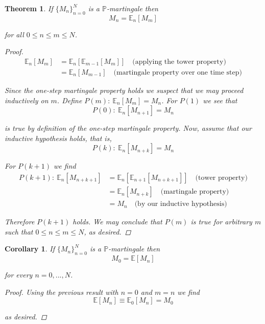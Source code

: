 \documentclass[12pt]{article}
\newtheorem{corollary}{Corollary}
\newtheorem{theorem}{Theorem}
\newlength\tindent
\renewcommand{\indent}{\hspace*{\tindent}}
\renewcommand{\P}{\mathbb P}
\newcommand{\E}{\mathbb E}
\begin{document}
\begin{theorem} If $\{M_n\}_{n = 0}^N$ is a $\P$-martingale then
\begin{equation*}
	M_n = \E_n[M_m]
\end{equation*}

for all $0 \leq n \leq m \leq N$.
\begin{proof}
\begin{align*}
	\E_n[M_m] &= \E_n[\E_{m - 1}[M_m]] \quad \text{(applying the tower property)} \\
	&= \E_n[M_{m - 1}] \quad \text{(martingale property over one time step)}
\end{align*}

\indent Since the one-step martingale property holds we suspect that we may proceed inductively on $m$. Define $P(m):~\E_n[M_m] = M_n$. For $P(1)$ we see that
\begin{equation*}
	P(0):~\E_n[M_{n + 1}] = M_n
\end{equation*}

is true by definition of the one-step martingale property. Now, assume that our inductive hypothesis holds, that is,
\begin{equation*}
	P(k):~\E_n[M_{n + k}] = M_n
\end{equation*}


For $P(k + 1)$ we find
\begin{align*}
	P(k + 1):~\E_n[M_{n + k + 1}] &= \E_n[\E_{n + 1}[M_{n + k + 1}]] \quad \text{(tower property)} \\
	&= \E_n[M_{n + k}] \quad \text{(martingale property)} \\
	&= M_n \quad \text{(by our inductive hypothesis)}
\end{align*}

\indent Therefore $P(k + 1)$ holds. We may conclude that $P(m)$ is true for arbitrary $m$ such that $0 \leq n \leq m \leq N$, as desired.
\end{proof}
\end{theorem}

\begin{corollary} If $\{M_n\}_{n = 0}^N$ is a $\P$-martingale then
\begin{equation*}
	M_0 = \E[M_n]
\end{equation*}

for every $n = 0, ..., N$.

\begin{proof} Using the previous result with $n = 0$ and $m = n$ we find
\begin{equation*}
	\E[M_n] \equiv \E_0[M_n] = M_0
\end{equation*}

as desired.
\end{proof}
\end{corollary}
\end{document}
